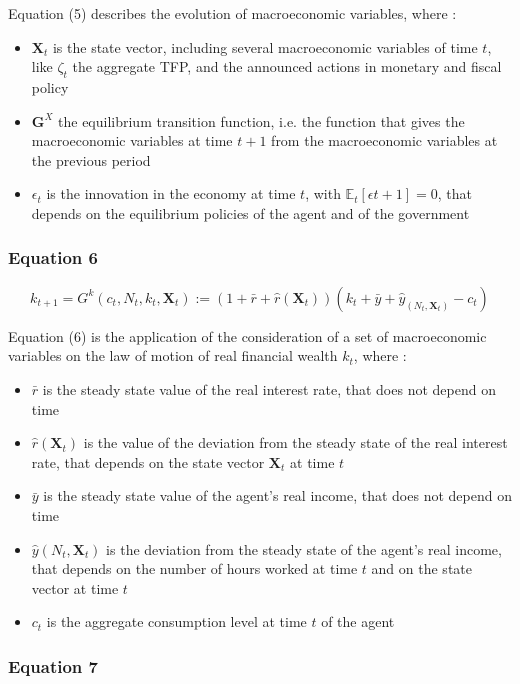 \documentclass{article}
\begin{document}
Equation (5) describes the evolution of macroeconomic variables, where : 
\begin{itemize}
    \item $\bm{X}_t$ is the state vector, including several macroeconomic variables of time $t$, like $\zeta_t$ the aggregate TFP, and the announced actions in monetary and fiscal policy
    \item $\bm{G}^X$ the equilibrium transition function, i.e. the function that gives the macroeconomic variables at time $t+1$ from the macroeconomic variables at the previous period
    \item $\epsilon_{t}$ is the innovation in the economy at time $t$, with $\mathbb{E}_{t}\left[\epsilon{t+1}\right]=0$, that depends on the equilibrium policies of the agent and of the government
\end{itemize}

\subsubsection*{Equation 6}

\begin{equation}
    k_{t+1}=G^{k}(c_{t},N_{t}, k_{t}, \bm{X}_{t}):= (1+\bar{r}+\hat{r}(\bm{X}_{t}))(k_{t}+\bar{y}+\hat{y}_(N_{t},\bm{X}_{t})-c_{t})
\end{equation}

Equation (6) is the application of the consideration of a set of macroeconomic variables on the law of motion of real financial wealth $k_{t}$, where : 
\begin{itemize}
    \item $\bar{r}$ is the steady state value of the real interest rate, that does not depend on time
    \item $\hat{r}(\bm{X}_{t})$ is the value of the deviation from the steady state of the real interest rate, that depends on the state vector $\bm{X}_{t}$ at time $t$
    \item $\bar{y}$ is the steady state value of the agent's real income, that does not depend on time
    \item $\hat{y}(N_{t},\bm{X}_{t})$ is the deviation from the steady state of the agent's real income, that depends on the number of hours worked at time $t$ and on the state vector at time $t$
    \item $c_{t}$ is the aggregate consumption level at time $t$ of the agent
\end{itemize}

\subsubsection*{Equation 7}
\end{document}

